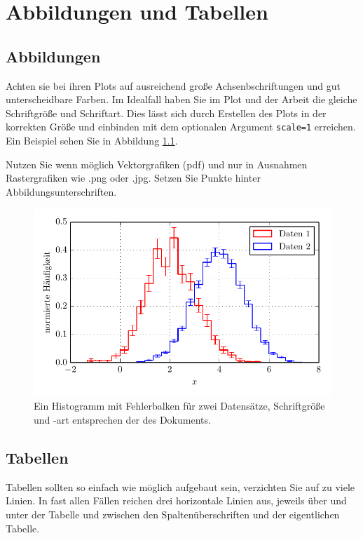 \chapter{Abbildungen und Tabellen}

\section{Abbildungen}

Achten sie bei ihren Plots auf ausreichend große Achsenbschriftungen und gut unterscheidbare Farben.
Im Idealfall haben Sie im Plot und der Arbeit die gleiche Schriftgröße und Schriftart.
Dies lässt sich durch Erstellen des Plots in der korrekten Größe und einbinden mit dem optionalen Argument \texttt{scale=1} erreichen. Ein Beispiel sehen Sie in Abbildung \ref{fig:bsp}.

Nutzen Sie wenn möglich Vektorgrafiken (pdf) und nur in Ausnahmen Rastergrafiken wie .png oder .jpg.
Setzen Sie Punkte hinter Abbildungsunterschriften.

\begin{figure}[!h]
    \centering
    \includegraphics[scale=1]{./Plots/Histogramm.pdf}
    \caption{Ein Histogramm mit Fehlerbalken für zwei Datensätze, Schriftgröße und -art entsprechen der des Dokuments.}
    \label{fig:bsp}
\end{figure}

\section{Tabellen}

Tabellen sollten so einfach wie möglich aufgebaut sein, verzichten Sie auf zu viele Linien. In fast allen Fällen reichen drei horizontale Linien aus, jeweils über und unter der Tabelle und zwischen den Spaltenüberschriften und der eigentlichen Tabelle.

